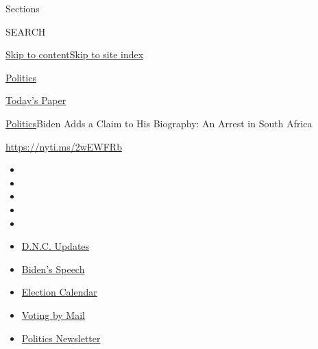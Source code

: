 Sections

SEARCH

\protect\hyperlink{site-content}{Skip to
content}\protect\hyperlink{site-index}{Skip to site index}

\href{https://www.nytimes3xbfgragh.onion/section/politics}{Politics}

\href{https://myaccount.nytimes3xbfgragh.onion/auth/login?response_type=cookie\&client_id=vi}{}

\href{https://www.nytimes3xbfgragh.onion/section/todayspaper}{Today's
Paper}

\href{/section/politics}{Politics}\textbar{}Biden Adds a Claim to His
Biography: An Arrest in South Africa

\url{https://nyti.ms/2wEWFRb}

\begin{itemize}
\item
\item
\item
\item
\item
\end{itemize}

\begin{itemize}
\item
  \href{https://www.nytimes3xbfgragh.onion/live/2020/08/20/us/dnc-convention-election?action=click\&pgtype=Article\&state=default\&region=TOP_BANNER\&context=storylines_menu}{D.N.C.
  Updates}
\item
  \href{https://www.nytimes3xbfgragh.onion/2020/08/20/us/politics/biden-presidential-nomination-dnc.html?action=click\&pgtype=Article\&state=default\&region=TOP_BANNER\&context=storylines_menu}{Biden's
  Speech}
\item
  \href{https://www.nytimes3xbfgragh.onion/interactive/2019/us/elections/2020-presidential-election-calendar.html?action=click\&pgtype=Article\&state=default\&region=TOP_BANNER\&context=storylines_menu}{Election
  Calendar}
\item
  \href{https://www.nytimes3xbfgragh.onion/interactive/2020/08/11/us/politics/vote-by-mail-us-states.html?action=click\&pgtype=Article\&state=default\&region=TOP_BANNER\&context=storylines_menu}{Voting
  by Mail}
\item
  \href{https://www.nytimes3xbfgragh.onion/newsletters/politics?action=click\&pgtype=Article\&state=default\&region=TOP_BANNER\&context=storylines_menu}{Politics
  Newsletter}
\end{itemize}

